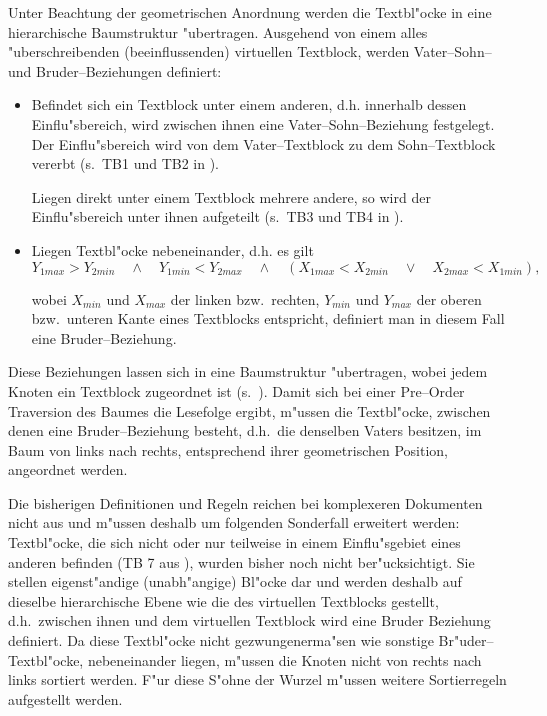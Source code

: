 
Unter Beachtung der geometrischen Anordnung werden die Textbl"ocke in eine hierarchische
Baumstruktur "ubertragen. Ausgehend von einem alles "uberschreibenden (beeinflussenden)
virtuellen Textblock, werden Vater--Sohn-- und Bruder--Beziehungen definiert:

\begin{itemize}
  \item Befindet sich ein Textblock unter einem anderen, d.h. innerhalb dessen Einflu"sbereich,
  wird zwischen ihnen eine Vater--Sohn--Beziehung festgelegt. Der Einflu"sbereich wird von dem
  Vater--Textblock zu dem Sohn--Textblock vererbt (s.\ TB1 und TB2 in ).
  
  Liegen direkt unter einem Textblock mehrere andere, so wird der Einflu"sbereich unter ihnen
  aufgeteilt (s.\ TB3 und TB4 in ).
 

  \item Liegen Textbl"ocke nebeneinander, d.h. es gilt
  $$Y_{1max} > Y_{2min} \quad \wedge \quad Y_{1min} < Y_{2max}
  \quad\wedge\quad 
  \left( X_{1max} < X_{2min} \quad \vee \quad X_{2max} < X_{1min} \right),$$
  
  wobei $X_{min}$ und $X_{max}$ der linken
  bzw.\ rechten, $Y_{min}$ und $Y_{max}$ der oberen bzw.\ unteren Kante eines Textblocks
  entspricht, definiert man in diesem Fall eine Bruder--Beziehung.
\end{itemize}

Diese Beziehungen lassen sich in eine Baumstruktur "ubertragen, wobei jedem Knoten ein Textblock
zugeordnet ist (s.\ ). 
Damit sich bei einer Pre--Order Traversion des Baumes die Lesefolge ergibt,
m"ussen die Textbl"ocke, zwischen denen eine Bruder--Beziehung besteht, 
d.h.\ die denselben Vaters besitzen, im Baum von links nach rechts, entsprechend ihrer
geometrischen Position, angeordnet werden.


Die bisherigen Definitionen und Regeln reichen bei komplexeren Dokumenten nicht aus und
m"ussen deshalb um folgenden Sonderfall erweitert werden:
Textbl"ocke, die sich nicht oder nur teilweise
in einem Einflu"sgebiet eines anderen befinden (TB 7 aus ), 
wurden bisher noch nicht ber"ucksichtigt.
Sie stellen eigenst"andige (unabh"angige) Bl"ocke dar und werden deshalb auf dieselbe
hierarchische Ebene wie die des virtuellen Textblocks gestellt, d.h.\ zwischen ihnen und dem
virtuellen Textblock wird eine Bruder Beziehung definiert. Da diese Textbl"ocke nicht
gezwungenerma"sen wie sonstige Br"uder--Textbl"ocke, nebeneinander liegen, m"ussen die Knoten nicht 
von rechts nach links sortiert werden. F"ur diese S"ohne der Wurzel m"ussen
weitere Sortierregeln aufgestellt werden.

